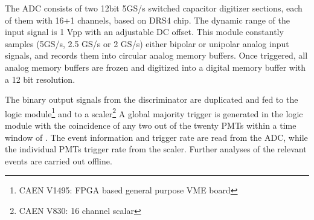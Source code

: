 The ADC consists of two 12bit 5GS/s switched capacitor digitizer sections, 
each of them with 16+1 channels, based on DRS4 chip. The dynamic range of the input signal is 1 
Vpp with an adjustable DC offset. This module constantly samples (5GS/s, 2.5 GS/s or 2 GS/s) either bipolar or unipolar analog input 
signals, and records them into circular 
analog memory buffers. Once triggered, all analog memory 
buffers are frozen and digitized into a digital memory buffer 
with a 12 bit resolution. 

The binary output signals from the discriminator are duplicated and fed to 
the logic module\footnote{CAEN V1495: FPGA based general purpose VME board} and to a scaler\footnote{CAEN V830: 16 channel scalar} 
A global majority trigger is generated in the logic module with the coincidence of any two out of 
the twenty PMTs within a time window of . The event information and trigger rate are read from the ADC, while the 
individual PMTs trigger rate from the scaler. Further analyses of the relevant events are carried out offline.










